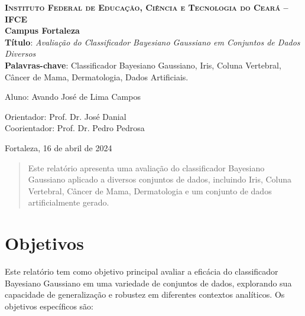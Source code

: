 \documentclass[12pt, a4paper]{report}
\begin{document}
\begin{titlepage}
  \centering
  \Large
  \textsc{\textbf{Instituto Federal de Educação, Ciência e Tecnologia do Ceará -- IFCE}}\\
  \textbf{Campus Fortaleza}\\[2.5cm]
  \LARGE
  \textbf{Título}: \textit{Avaliação do Classificador Bayesiano Gaussiano em Conjuntos de Dados Diversos}\\[1.5cm]
  \textbf{Palavras-chave}: Classificador Bayesiano Gaussiano, Iris, Coluna Vertebral, Câncer de Mama, Dermatologia, Dados Artificiais. \\[3cm]
  \Large

 \begin{minipage}[t][][t]{5cm}
 \end{minipage}
 \begin{minipage}[t][][t]{10cm}
	\begin{flushleft}
   Aluno: Avando José de Lima Campos
  \end{flushleft}
  \end{minipage}

\vspace{1cm}

  \begin{minipage}[t][][t]{5cm}
  \end{minipage}
  \begin{minipage}[t][][t]{14cm}
	\begin{flushleft}
   Orientador: Prof. Dr. José Danial\\ 
   Coorientador: Prof. Dr. Pedro Pedrosa
  \end{flushleft}
  \end{minipage}

  \vfill \large
  Fortaleza, 16 de abril de 2024
\end{titlepage}

\begin{abstract}
Este relatório apresenta uma avaliação do classificador Bayesiano Gaussiano aplicado a diversos conjuntos de dados, incluindo Iris, Coluna Vertebral, Câncer de Mama, Dermatologia e um conjunto de dados artificialmente gerado.
\end{abstract}

\tableofcontents
\listoffigures

\chapter{Objetivos}

Este relatório tem como objetivo principal avaliar a eficácia do classificador Bayesiano Gaussiano em uma variedade de conjuntos de dados, explorando sua capacidade de generalização e robustez em diferentes contextos analíticos. Os objetivos específicos são:
\end{document}
